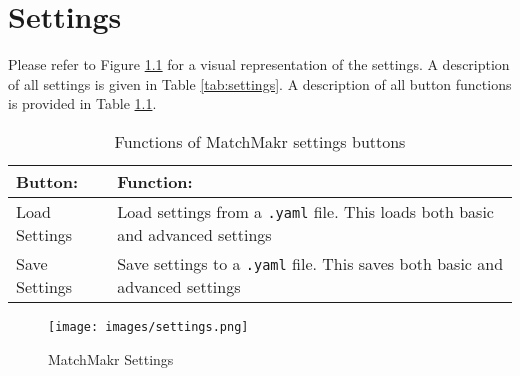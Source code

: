 \chapter{Settings}
\renewcommand{\arraystretch}{1}

Please refer to Figure \ref{fig:settings} for a visual representation of the settings.  A description of all settings is given in Table \ref{tab:settings}.  A description of all button functions is provided in Table \ref{tab:settings_buttons}.

%
%

\newcommand{\buttontable}
	{
		\begin{table}[h!]
			\centering
			\begin{tabular}[t]{| p{2in} | p{2.1in} |}
			
				\hline \textbf{Button:} & \textbf{Function:} \\ \hline \hline
				
				Load Settings & Load settings from a \texttt{.yaml} file.  This loads both basic and advanced settings \\ \hline
				Save Settings & Save settings to a \texttt{.yaml} file.  This saves both basic and advanced settings \\ \hline				
				
				
			\end{tabular}
			\caption{\label{tab:settings_buttons} Functions of MatchMakr settings buttons}
		\end{table}	
	}
	
\buttontable


%
%
\begin{figure}
	\centering
	\texttt{[image: images/settings.png]}
	\caption{\label{fig:settings} MatchMakr Settings}
\end{figure}

